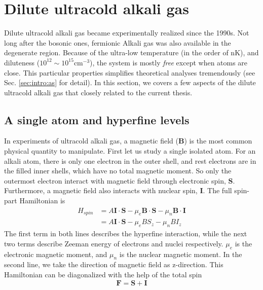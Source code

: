 \chapter{Dilute ultracold alkali gas}\label{sec:intro:one}
Dilute ultracold alkali gas became experimentally realized since the 1990s.  Not long after the bosonic ones, fermionic Alkali gas was also available in the degenerate region.  Because of the ultra-low temperature (in the order of nK), and diluteness ($10^{12}\sim10^{15}\text{cm}^{-3}$), the system is mostly \emph{free} except when atoms are close.   This particular properties simplifies theoretical analyses tremendously (see Sec. \ref{sec:intro:as} for detail).  In this section, we covers a few aspects of the dilute ultracold alkali gas that closely related to the current thesis.     

\section{A single atom and hyperfine levels}
In experiments of ultracold alkali gas, a magnetic field ($\mathbf{B}$) is the most common physical quantity to manipulate.  First let us study a  single isolated atom.  For an alkali atom, there is only one electron in the outer shell, and rest electrons are in the filled inner shells, which have no total magnetic moment.  So only the outermost electron interact with magnetic field through electronic spin, $\mathbf{S}$.  Furthermore, a magnetic field also interacts with nuclear spin, $\mathbf{I}$.  The full spin-part Hamiltonian is
\begin{equation}
\begin{split}\label{eq:intro:1atom}
H_{spin}&=A \mathbf{I}\cdot\mathbf{S}-\mu_{e}\mathbf{B}\cdot\mathbf{S}-{\mu}_{n}\mathbf{B}\cdot\mathbf{I}\\
&=A \mathbf{I}\cdot\mathbf{S}-\mu_{e}{B}{S_{z}}-{\mu}_{n}{B}{I_{z}}
\end{split}
\end{equation}
The first term in both lines describes the hyperfine interaction, while the next two terms describe Zeeman energy of electrons and nuclei respectively. $\mu_{e}$ is the electronic magnetic moment, and $\mu_n$ is the nuclear magnetic moment.  In the second line, we take the direction of magnetic field as z-direction. This Hamiltonian can be diagonalized with the help of the total spin 
\begin{equation}
\mathbf{F}=\mathbf{S}+\mathbf{I}
\end{equation}
